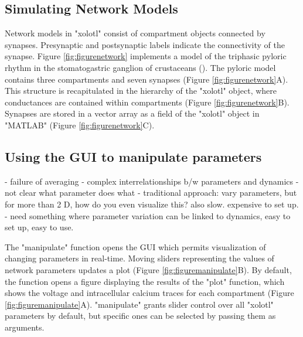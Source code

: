 \documentclass{frontiersSCNS} %
\begin{document}
%
%
%
%
%
%



\subsection{Simulating Network Models}



Network models in "xolotl" consist of compartment objects connected by synapses. Presynaptic and postsynaptic labels indicate the connectivity of the synapse. Figure \ref{fig:figurenetwork} implements a model of the triphasic pyloric rhythm in the stomatogastric ganglion of crustaceans (\cite{prinzSimilarNetworkActivity2004}). The pyloric model contains three compartments and seven synapses (Figure \ref{fig:figurenetwork}A). This structure is recapitulated in the hierarchy of the "xolotl" object, where conductances are contained within compartments (Figure \ref{fig:figurenetwork}B). Synapses are stored in a vector array as a field of the "xolotl" object in "MATLAB" (Figure \ref{fig:figurenetwork}C).



%
%
%
%
%
%

\subsection{Using the GUI to manipulate parameters}


- failure of averaging
- complex interrelationships b/w parameters and dynamics
- not clear what parameter does what
- traditional approach: vary parameters, but for more than 2 D, how do you even visualize this? also slow. expensive to set up. 
- need something where parameter variation can be linked to dynamics, easy to set up, easy to use. 

The "manipulate" function opens the GUI which permits visualization of changing parameters in real-time. Moving sliders representing the values of network parameters updates a plot (Figure \ref{fig:figuremanipulate}B). By default, the function opens a figure displaying the results of the "plot" function, which shows the voltage and intracellular calcium traces for each compartment (Figure \ref{fig:figuremanipulate}A). "manipulate" grants slider control over all "xolotl" parameters by default, but specific ones can be selected by passing them as arguments.
\end{document}
